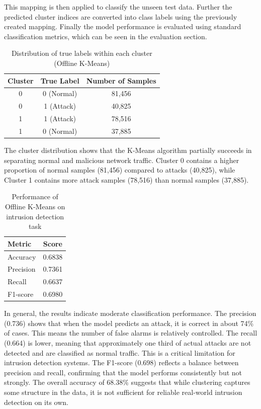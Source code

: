 \nextparagraph
This mapping is then applied to classify the unseen test data. Further the predicted cluster indices are converted into class labels using the previously created mapping. Finally the model performance is evaluated using standard classification metrics, which can be seen in the evaluation section.

\begin{table}[h]
\centering
\begin{tabular}{c|c|c}
\hline
\textbf{Cluster} & \textbf{True Label} & \textbf{Number of Samples} \\
\hline
0 & 0 (Normal) & 81,456 \\
0 & 1 (Attack) & 40,825 \\
1 & 1 (Attack) & 78,516 \\
1 & 0 (Normal) & 37,885 \\
\hline
\end{tabular}
\caption{Distribution of true labels within each cluster (Offline K-Means)}
\end{table}

\nextparagraph
The cluster distribution shows that the K-Means algorithm partially succeeds in separating normal and malicious network traffic. Cluster 0 contains a higher proportion of normal samples (81,456) compared to attacks (40,825), while Cluster 1 contains more attack samples (78,516) than normal samples (37,885).


\begin{table}[h]
\centering
\begin{tabular}{lc}
\hline
\textbf{Metric} & \textbf{Score} \\
\hline
Accuracy & 0.6838 \\
Precision & 0.7361 \\
Recall & 0.6637 \\
F1-score & 0.6980 \\
\hline
\end{tabular}
\caption{Performance of Offline K-Means on intrusion detection task}
\end{table}

\nextparagraph
In general, the results indicate moderate classification performance.
The precision (0.736) shows that when the model predicts an attack, it is correct in about 74\% of cases. This means the number of false alarms is relatively controlled. The recall (0.664) is lower, meaning that approximately one third of actual attacks are not detected and are classified as normal traffic. This is a critical limitation for intrusion detection systems. The F1-score (0.698) reflects a balance between precision and recall, confirming that the model performs consistently but not strongly. The overall accuracy of 68.38\% suggests that while clustering captures some structure in the data, it is not sufficient for reliable real-world intrusion detection on its own.


